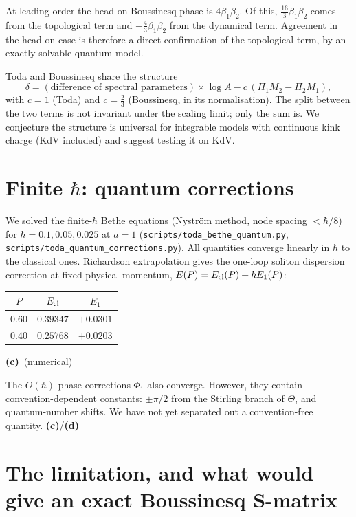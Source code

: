 \documentclass[11pt,a4paper]{article}
\newcommand{\Lc}{\textsf{\textbf{(c)}}}\newcommand{\Ld}{\textsf{\textbf{(d)}}}
\newcommand{\script}[1]{\texttt{scripts/#1}}
\begin{document}
At leading order the head-on Boussinesq phase is $4\beta_1\beta_2$. Of this, $\tfrac{16}3\beta_1\beta_2$ comes from the topological term and $-\tfrac43\beta_1\beta_2$ from the dynamical term. Agreement in the head-on case is therefore a direct confirmation of the topological term, by an exactly solvable quantum model.

\begin{remark}[\Ld]
Toda and Boussinesq share the structure
\[
\delta=(\text{difference of spectral parameters})\times\log A-c\,(\Pi_1M_2-\Pi_2M_1),
\]
with $c=1$ (Toda) and $c=\tfrac23$ (Boussinesq, in its normalisation). The split between the two terms is not invariant under the scaling limit; only the sum is. We conjecture the structure is universal for integrable models with continuous kink charge (KdV included) and suggest testing it on KdV.
\end{remark}

\section{Finite $\hbar$: quantum corrections}

We solved the finite-$\hbar$ Bethe equations (Nyström method, node spacing $<\hbar/8$) for $\hbar=0.1,0.05,0.025$ at $a=1$ (\script{toda\_bethe\_quantum.py}, \script{toda\_quantum\_corrections.py}). All quantities converge linearly in $\hbar$ to the classical ones. Richardson extrapolation gives the one-loop soliton dispersion correction at fixed physical momentum, $E(P)=E_{\rm cl}(P)+\hbar E_1(P)$:

\begin{center}\begin{tabular}{ccc}\toprule $P$ & $E_{\rm cl}$ & $E_1$\\\midrule $0.60$ & $0.39347$ & $+0.0301$\\ $0.40$ & $0.25768$ & $+0.0203$\\\bottomrule\end{tabular}\end{center}
\Lc\ (numerical)

The $O(\hbar)$ phase corrections $\Phi_1$ also converge. However, they contain convention-dependent constants: $\pm\pi/2$ from the Stirling branch of $\Theta$, and quantum-number shifts. We have not yet separated out a convention-free quantity. \Lc/\Ld

\section{The limitation, and what would give an exact Boussinesq S-matrix}
\end{document}
